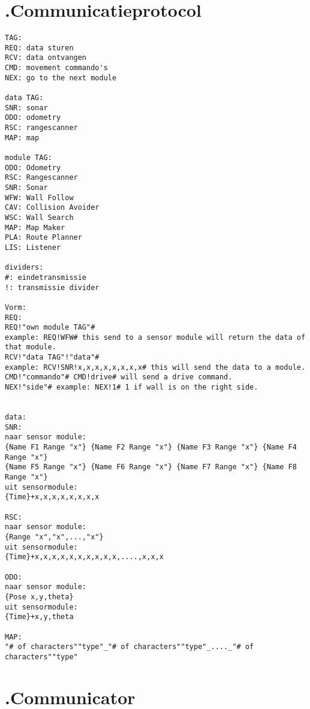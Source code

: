 \documentclass[a4paper,10pt]{article}
\begin{document}
\section*{\label{protocol}\thesection.\quad Communicatieprotocol}
\begin{verbatim}
TAG:
REQ: data sturen
RCV: data ontvangen
CMD: movement commando's
NEX: go to the next module

data TAG:
SNR: sonar
ODO: odometry
RSC: rangescanner
MAP: map

module TAG:
ODO: Odometry
RSC: Rangescanner
SNR: Sonar
WFW: Wall Follow
CAV: Collision Avoider
WSC: Wall Search
MAP: Map Maker
PLA: Route Planner
LIS: Listener

dividers:
#: eindetransmissie
!: transmissie divider

Vorm:
REQ:
REQ!"own module TAG"# 
example: REQ!WFW# this send to a sensor module will return the data of that module.
RCV!"data TAG"!"data"# 
example: RCV!SNR!x,x,x,x,x,x,x,x# this will send the data to a module.
CMD!"commando"# CMD!drive# will send a drive command.
NEX!"side"# example: NEX!1# 1 if wall is on the right side.


data:
SNR:
naar sensor module:
{Name F1 Range "x"} {Name F2 Range "x"} {Name F3 Range "x"} {Name F4 Range "x"} 
{Name F5 Range "x"} {Name F6 Range "x"} {Name F7 Range "x"} {Name F8 Range "x"}
uit sensormodule:
{Time}+x,x,x,x,x,x,x,x

RSC:
naar sensor module:
{Range "x","x",...,"x"}
uit sensormodule:
{Time}+x,x,x,x,x,x,x,x,x,x,....,x,x,x

ODO:
naar sensor module:
{Pose x,y,theta}
uit sensormodule:
{Time}+x,y,theta

MAP:
"# of characters""type"_"# of characters""type"_...._"# of characters""type"
\end{verbatim}

\section*{\label{communicator}\thesection.\quad Communicator}
\end{document}
